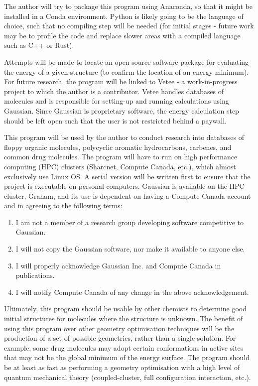 \documentclass{article}
\begin{document}
\vspace{3mm} %
\newpage
{}

\vspace{2mm} %

The author will try to package this program using Anaconda, so that it might be 
installed in a Conda environment. Python is likely going to be the language of 
choice, such that no compiling step will be needed (for initial stages - future 
work may be to profile the code and replace slower areas with a compiled 
language such as C++ or Rust).

Attempts will be made to locate an open-source software package for evaluating 
the energy of a given structure (to confirm the location of an energy minimum). 
For future research, the program will be linked to Vetee - a work-in-progress 
project to which the author is a contributor. Vetee handles databases of 
molecules and is responsible for setting-up and running calculations using 
Gaussian. Since Gaussian is proprietary software, the energy calculation step 
should be left open such that the user is not restricted behind a paywall.

This program will be used by the author to conduct research into databases of 
floppy organic molecules, polycyclic aromatic hydrocarbons, carbenes, and 
common drug molecules. The program will have to run on high performance 
computing (HPC) clusters (Sharcnet, Compute Canada, etc.), which almost 
exclusively use Linux OS. A serial version will be written first to ensure that 
the project is executable on personal computers. Gaussian is available on the 
HPC cluster, Graham, and its use is dependent on having a Compute Canada 
account and in agreeing to the following terms:
\begin{enumerate}
	\item {I am not a member of a research group developing software 
		competitive to Gaussian.}
	\item {I will not copy the Gaussian software, nor make it available to 
		anyone else.}
	\item {I will properly acknowledge Gaussian Inc. and Compute Canada in 
		publications.}
	\item {I will notify Compute Canada of any change in the above 
		acknowledgement.}
\end{enumerate}

Ultimately, this program should be usable by other chemists to determine good 
initial structures for molecules where the structure is unknown. The benefit of 
using this program over other geometry optimisation techniques will be the 
production of a set of possible geometries, rather than a single solution. For 
example, some drug molecules may adopt certain conformations in active sites 
that may not be the global minimum of the energy surface. The program should be 
at least as fast as performing a geometry optimisation with a high level of 
quantum mechanical theory (coupled-cluster, full configuration interaction, 
etc.).






\end{document}
